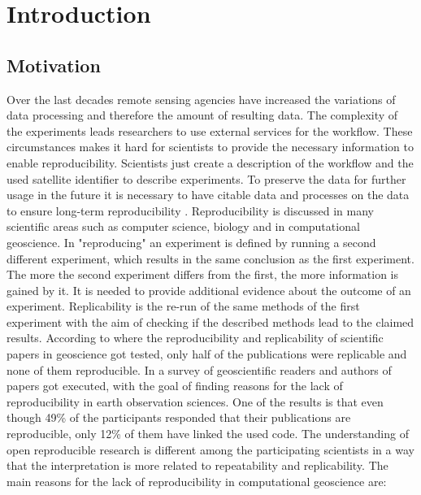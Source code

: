 \documentclass[draft,final]{vutinfth} %
\begin{document}

\tableofcontents %

\mainmatter

\chapter{Introduction}\label{Introduction}
\section{Motivation}\label{Motivation}
Over the last decades remote sensing agencies have increased the variations of data processing and therefore the amount of resulting data. The complexity of the experiments leads researchers to use external services for the workflow. These circumstances makes it hard for scientists to provide the necessary information to enable reproducibility. Scientists just create a description of the workflow and the used satellite identifier to describe experiments. To preserve the data for further usage in the future it is necessary to have citable data and processes on the data to ensure long-term reproducibility \cite{6352411}. Reproducibility is discussed in many scientific areas such as computer science, biology and in computational geoscience. In \cite{reprovsrepli} "reproducing" an experiment is defined by running a second different experiment, which results in the same conclusion as the first experiment. The more the second experiment differs from the first, the more information is gained by it. It is needed to provide additional evidence about the outcome of an experiment. Replicability is the re-run of the same methods of the first experiment with the aim of checking if the described methods lead to the claimed results\cite{reprovsrepli}. According to \cite{Ostermann2017AdvancingSW} where the reproducibility and replicability of scientific papers in geoscience got tested, only half of the publications were replicable and none of them reproducible. In \cite{Thestateofreproducibility} a survey of geoscientific readers and authors of papers got executed, with the goal of finding reasons for the lack of reproducibility in earth observation sciences. One of the results is that even though 49\% of the participants responded that their publications are reproducible, only 12\% of them have linked the used code. The understanding of open reproducible research is different among the participating scientists in a way that the interpretation is more related to repeatability and replicability. The main reasons for the lack of reproducibility in computational geoscience are:
\end{document}
